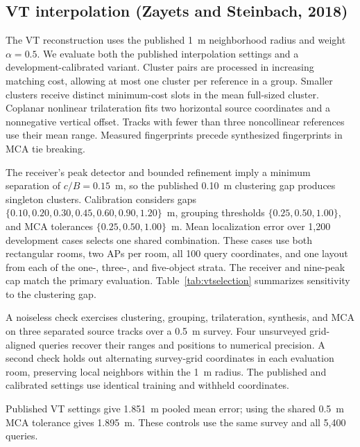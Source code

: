 \documentclass[10pt]{article}
\begin{document}
\subsection{VT interpolation (Zayets and Steinbach, 2018)}
The VT reconstruction uses the published 1~m neighborhood radius and weight $\alpha=0.5$. We evaluate both the published interpolation settings and a development-calibrated variant. Cluster pairs are processed in increasing matching cost, allowing at most one cluster per reference in a group. Smaller clusters receive distinct minimum-cost slots in the mean full-sized cluster. Coplanar nonlinear trilateration fits two horizontal source coordinates and a nonnegative vertical offset. Tracks with fewer than three noncollinear references use their mean range. Measured fingerprints precede synthesized fingerprints in MCA tie breaking.

The receiver's peak detector and bounded refinement imply a minimum separation of $c/B=0.15$~m, so the published 0.10~m clustering gap produces singleton clusters. Calibration considers gaps $\{0.10,0.20,0.30,0.45,0.60,0.90,1.20\}$~m, grouping thresholds $\{0.25,0.50,1.00\}$, and MCA tolerances $\{0.25,0.50,1.00\}$~m. Mean localization error over 1,200 development cases selects one shared combination. These cases use both rectangular rooms, two APs per room, all 100 query coordinates, and one layout from each of the one-, three-, and five-object strata. The receiver and nine-peak cap match the primary evaluation. Table~\ref{tab:vtselection} summarizes sensitivity to the clustering gap.


A noiseless check exercises clustering, grouping, trilateration, synthesis, and MCA on three separated source tracks over a 0.5~m survey. Four unsurveyed grid-aligned queries recover their ranges and positions to numerical precision. A second check holds out alternating survey-grid coordinates in each evaluation room, preserving local neighbors within the 1~m radius. The published and calibrated settings use identical training and withheld coordinates.


Published VT settings give 1.851~m pooled mean error; using the shared 0.5~m MCA tolerance gives 1.895~m. These controls use the same survey and all 5,400 queries.

\FloatBarrier
\end{document}
